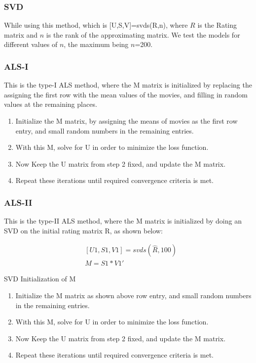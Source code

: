\subsubsection{SVD}
While using this method, which is [U,S,V]=svds(R,n), where $R$ is the Rating
matrix and $n$ is the rank of the approximating matrix. We test the models for
different values of $n$, the maximum being $n$=200. 

\subsubsection{ALS-I}
This is the type-I ALS method, where the M matrix is initialized by replacing
the assigning the first row with the mean values of the movies, and filling in
random values at the remaining places. 



\begin{enumerate}
 \item Initialize the M matrix, by assigning the means of movies as
the first row entry, and small random numbers in the remaining entries. 
 \item  With this M, solve for U in order to minimize the loss
function.
 \item Now Keep the U matrix from step 2 fixed, and update the M
matrix.
 \item Repeat these iterations until required convergence criteria
is met.
\end{enumerate}


\subsubsection{ALS-II}
This is the type-II ALS method, where the M matrix is initialized by doing an
SVD on the initial rating matrix R, as shown below:

\begingroup
\begin{center}
\begin{align*}
& [U1,S1,V1]=svds(\hat{R},100) \\
& M=S1*V1' 
\end{align*}
\caption{SVD Initialization of M}
\end{center}
\endgroup


\begin{enumerate}
 \item Initialize the M matrix as shown above row entry, and small random
numbers in the remaining
entries. 
 \item With this M, solve for U in order to minimize the loss
function.
 \item Now Keep the U matrix from step 2 fixed, and update
the M matrix.
 \item Repeat these iterations until required convergence
criteria is met.
\end{enumerate}

